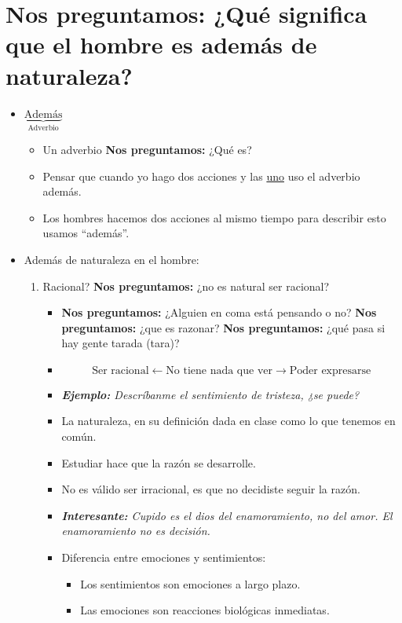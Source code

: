 \section{\textbf{Nos preguntamos:} ¿Qué significa que el hombre es además de naturaleza?}
\begin{itemize}
    \item $\underbrace{\text{Además}}_{\text{Adverbio}}$ 
        \begin{itemize}
            \item Un adverbio \textbf{Nos preguntamos:} ¿Qué es? 
            \item Pensar que cuando yo hago dos acciones y las \underline{uno} uso el adverbio además.
            \item Los hombres hacemos dos acciones al mismo tiempo para describir esto usamos ``además''.
        \end{itemize}
    
    \item Además de naturaleza en el hombre:
        \begin{enumerate}
            \item Racional? \textbf{Nos preguntamos:} ¿no es natural ser racional?
                \begin{itemize}
                    \item \textbf{Nos preguntamos:} ¿Alguien en coma está pensando o no? \textbf{Nos preguntamos:} ¿que es razonar? \textbf{Nos preguntamos:} ¿qué pasa si hay gente tarada (tara)?
                    \item \[
                      \text{Ser racional} \leftarrow \text{No tiene nada que ver} \rightarrow \text{Poder expresarse}
                    \]
                    \item \emph{\textbf{Ejemplo: }Descríbanme el sentimiento de tristeza, ¿se puede?}
                    \item La naturaleza, en su definición dada en clase como lo que tenemos en común.
                    \item Estudiar hace que la razón se desarrolle.
                    \item No es válido ser irracional, es que no decidiste seguir la razón.
                    \item \emph{\textbf{Interesante:} Cupido es el dios del enamoramiento, no del amor. El enamoramiento no es decisión.}
                    \item Diferencia entre emociones y sentimientos:
                        \begin{itemize}
                            \item Los sentimientos son emociones a largo plazo.
                            \item Las emociones son reacciones biológicas inmediatas.
                        \end{itemize}
                    

\end{itemize}
\end{enumerate}
\end{itemize}
